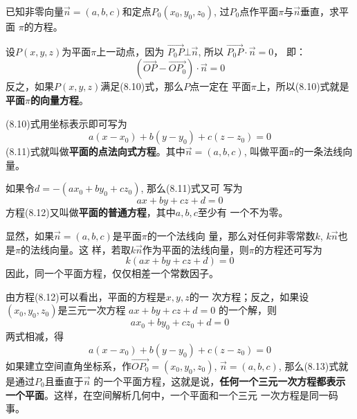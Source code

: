 已知非零向量$\vec{n}=(a,b,c)$和定点$P_0(x_0,y_0,z_0)$,
过$P_0$点作平面$\pi$与$\vec{n}$垂直，求平面
$\pi$的方程。

\begin{figure}[htp]
    \centering
{}
    \caption{}
\end{figure}

设$P(x,y,z)$为平面$\pi$上一动点，因为
$\Vec{P_0P}\bot\vec{n}$, 所以
$\Vec{P_0P}\cdot \vec{n}=0$，
即：
\begin{equation}
    \left(\Vec{OP}-\Vec{OP_0}\right)\cdot\vec{n}=0
\end{equation}
反之，如果$P(x,y,z)$满足(8.10)式，那么$P$点一定在
平面$\pi$上，所以(8.10)式就是\textbf{平面$\pi$的向量方程}。

(8.10)式用坐标表示即可写为
\begin{equation}
    a(x-x_0)+b(y-y_0)+c(z-z_0)=0
\end{equation}
(8.11)式就叫做\textbf{平面的点法向式方程}。其中$\vec{n}=(a,b,c)$, 
叫做平面$\pi$的一条法线向量。

如果令$d=-(ax_0+by_0+cz_0)$, 那么(8.11)式又可
写为
\begin{equation}
    ax+by+cz+d=0
\end{equation}
方程(8.12)又叫做\textbf{平面的普通方程}，其中$a,b,c$至少有
一个不为零。

显然，如果$\vec{n}=(a,b,c)$是平面$\pi$的一个法线向
量，那么对任何非零常数$k$, $k\vec{n}$也是$\pi$的法线向量。这
样，若取$k\vec{n}$作为平面的法线向量，则$\pi$的方程还可写为
\[k(ax+by+cz+d)=0\]
因此，同一个平面方程，仅仅相差一个常数因子。

由方程(8.12)可以看出，平面的方程是$x,y,z$的一
次方程；反之，如果设$(x_0,y_0,z_0)$是三元一次方程
$ax+by+cz+d=0$
的一个解，则
\[ax_0+by_0+cz_0+d=0\]
两式相减，得
\begin{equation}
    a(x-x_0)+b(y-y_0)+c(z-z_0)=0
\end{equation}
如果建立空间直角坐标系，作$\Vec{OP_0}=(x_0,y_0,z_0)$,
 $\vec{n}=(a,b,c)$, 那么(8.13)式就是通过$P_0$且垂直于$\vec{n}$
的一个平面方程，这就是说，\textbf{任何一个三元一次方程都表示
一个平面}。这样，在空间解析几何中，一个平面和一个三元
一次方程是同一码事。


